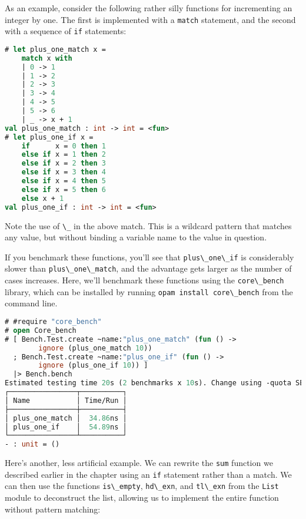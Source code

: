 As an example, consider the following rather silly functions for
incrementing an integer by one. The first is implemented with a
\passthrough{\lstinline!match!} statement, and the second with a
sequence of \passthrough{\lstinline!if!} statements:

\begin{lstlisting}[language=Caml]
# let plus_one_match x =
    match x with
    | 0 -> 1
    | 1 -> 2
    | 2 -> 3
    | 3 -> 4
    | 4 -> 5
    | 5 -> 6
    | _ -> x + 1
val plus_one_match : int -> int = <fun>
# let plus_one_if x =
    if      x = 0 then 1
    else if x = 1 then 2
    else if x = 2 then 3
    else if x = 3 then 4
    else if x = 4 then 5
    else if x = 5 then 6
    else x + 1
val plus_one_if : int -> int = <fun>
\end{lstlisting}

Note the use of \passthrough{\lstinline!\_!} in the above match. This is
a wildcard pattern that matches any value, but without binding a
variable name to the value in question.

If you benchmark these functions, you'll see that
\passthrough{\lstinline!plus\_one\_if!} is considerably slower than
\passthrough{\lstinline!plus\_one\_match!}, and the advantage gets
larger as the number of cases increases. Here, we'll benchmark these
functions using the \passthrough{\lstinline!core\_bench!} library, which
can be installed by running
\passthrough{\lstinline!opam install core\_bench!} from the command
line.

\begin{lstlisting}[language=Caml]
# #require "core_bench"
# open Core_bench
# [ Bench.Test.create ~name:"plus_one_match" (fun () ->
        ignore (plus_one_match 10))
  ; Bench.Test.create ~name:"plus_one_if" (fun () ->
        ignore (plus_one_if 10)) ]
  |> Bench.bench
Estimated testing time 20s (2 benchmarks x 10s). Change using -quota SECS.
┌────────────────┬──────────┐
│ Name           │ Time/Run │
├────────────────┼──────────┤
│ plus_one_match │  34.86ns │
│ plus_one_if    │  54.89ns │
└────────────────┴──────────┘
- : unit = ()
\end{lstlisting}

Here's another, less artificial example. We can rewrite the
\passthrough{\lstinline!sum!} function we described earlier in the
chapter using an \passthrough{\lstinline!if!} statement rather than a
match. We can then use the functions
\passthrough{\lstinline!is\_empty!}, \passthrough{\lstinline!hd\_exn!},
and \passthrough{\lstinline!tl\_exn!} from the
\passthrough{\lstinline!List!} module to deconstruct the list, allowing
us to implement the entire function without pattern matching:

